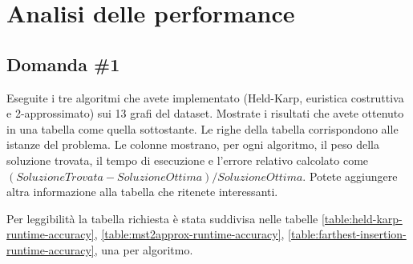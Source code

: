 \section{Analisi delle performance}
\label{cap:performance-analysis}

\subsection{Domanda \#1}

\begin{displayquote}
Eseguite i tre algoritmi che avete implementato (Held-Karp, 
euristica costruttiva e 2-approssimato) sui 13 grafi del dataset.
Mostrate i risultati che avete ottenuto in una tabella come quella
sottostante. Le righe della tabella corrispondono alle istanze del
problema. Le colonne mostrano, per ogni algoritmo, il peso della
soluzione trovata, il tempo di esecuzione e l'errore relativo 
calcolato come $(SoluzioneTrovata-SoluzioneOttima)/SoluzioneOttima$.
Potete aggiungere altra informazione alla tabella che ritenete 
interessanti.
\end{displayquote}

Per leggibilità la tabella richiesta è stata suddivisa nelle tabelle 
\ref{table:held-karp-runtime-accuracy},
\ref{table:mst2approx-runtime-accuracy},
\ref{table:farthest-insertion-runtime-accuracy}, 
una per algoritmo.

